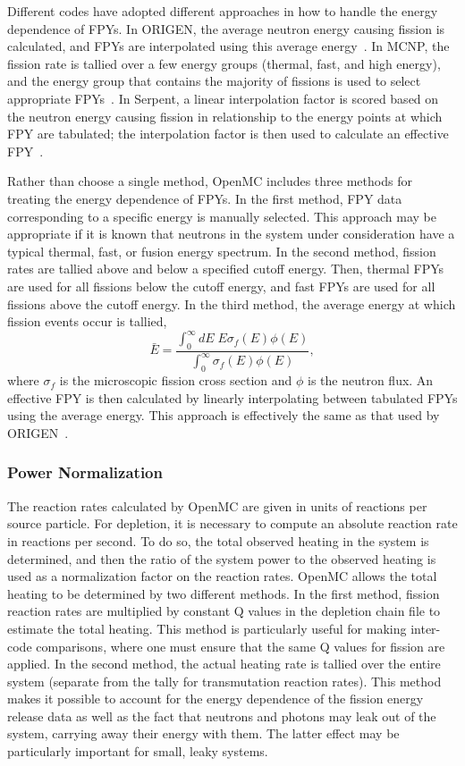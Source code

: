 \documentclass[3p,authoryear]{elsarticle}
\begin{document}
Different codes have adopted different approaches in how to handle the energy
dependence of FPYs. In ORIGEN, the average neutron energy causing fission is
calculated, and FPYs are interpolated using this average
energy~\citep{gauld2011nt}. In MCNP, the fission rate is tallied over a few
energy groups (thermal, fast, and high energy), and the energy group that
contains the majority of fissions is used to select appropriate
FPYs~\citep{fensin2008nt,fensin2011lanl}. In Serpent, a linear interpolation
factor is scored based on the neutron energy causing fission in relationship to
the energy points at which FPY are tabulated; the interpolation factor is then
used to calculate an effective FPY~\citep{kunchev2019mc}.

Rather than choose a single method, OpenMC includes three methods for treating
the energy dependence of FPYs. In the first method, FPY data corresponding to a
specific energy is manually selected. This approach may be appropriate if it is
known that neutrons in the system under consideration have a typical thermal,
fast, or fusion energy spectrum. In the second method, fission rates are tallied
above and below a specified cutoff energy. Then, thermal FPYs are used for all
fissions below the cutoff energy, and fast FPYs are used for all fissions above
the cutoff energy. In the third method, the average energy at which fission
events occur is tallied,
\begin{equation}
  \bar{E} = \frac{\int_0^\infty dE \; E \sigma_f(E)\phi(E)}{\int_0^\infty \sigma_f(E) \phi(E)},
\end{equation}
where $\sigma_f$ is the microscopic fission cross section and $\phi$ is the
neutron flux. An effective FPY is then calculated by linearly interpolating
between tabulated FPYs using the average energy. This approach is effectively
the same as that used by ORIGEN~\citep{gauld2011nt}.

\subsubsection{Power Normalization}

The reaction rates calculated by OpenMC are given in units of reactions per
source particle. For depletion, it is necessary to compute an absolute reaction
rate in reactions per second. To do so, the total observed heating in the system
is determined, and then the ratio of the system power to the observed heating is
used as a normalization factor on the reaction rates. OpenMC allows the total
heating to be determined by two different methods. In the first method, fission
reaction rates are multiplied by constant Q values in the depletion chain file
to estimate the total heating. This method is particularly useful for making
inter-code comparisons, where one must ensure that the same Q values for fission
are applied. In the second method, the actual heating rate is tallied over the
entire system (separate from the tally for transmutation reaction rates). This
method makes it possible to account for the energy dependence of the fission
energy release data as well as the fact that neutrons and photons may leak out
of the system, carrying away their energy with them. The latter effect may be
particularly important for small, leaky systems.
\end{document}
